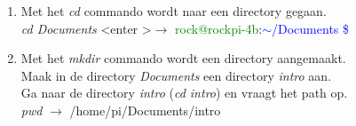 \begin{enumerate}
\begin{enumerate}
\begin{enumerate}
	\item  Met het \textit{cd} commando wordt naar een directory gegaan.\\  
	\textit{cd Documents} \textless enter \textgreater $\rightarrow$  
	\textcolor{green}{rock@rockpi-4b}:\textcolor{blue}{$\mathtt{\sim}$/Documents \$}
	\item  Met het \textit{mkdir} commando wordt een directory aangemaakt.\\
	Maak in de directory \textit{Documents} een directory \textit{intro} aan. \\
	Ga naar de directory \textit{intro} (\textit{cd intro}) en vraagt het path op.\\
	\textit{pwd}  $\rightarrow$  /home/pi/Documents/intro
	
\end{enumerate}


\end{enumerate}
\end{enumerate}
